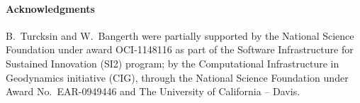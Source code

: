 \documentclass{article}
\begin{document}
\paragraph*{Acknowledgments}
B.~Turcksin and W.~Bangerth were partially supported by the National Science
Foundation under award OCI-1148116 as part of the Software Infrastructure for
Sustained Innovation (SI2) program; by the Computational
Infrastructure in Geodynamics initiative (CIG), through the National Science
Foundation under Award No.~EAR-0949446 and The University of California --
Davis.



\end{document}
